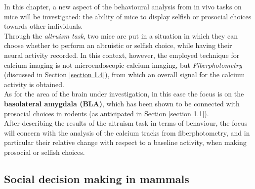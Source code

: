 \documentclass[12pt, a4paper]{article}
\begin{document}
In this chapter, a new aspect of the behavioural analysis from in vivo tasks on mice will be investigated: the ability of mice to display selfish or prosocial choices towards other individuals.\\
Through the \textit{altruism task}, two mice are put in a situation in which they can choose whether to perform an altruistic or selfish choice, while having their neural activity recorded. In this context, however, the employed technique for calcium imaging is not microendoscopic calcium imaging, but \textit{Fiberphotometry} (discussed in Section \ref{section 1.4}), from which an overall signal for the calcium activity is obtained.\\
As for the area of the brain under investigation, in this case the focus is on the \textbf{basolateral amygdala (BLA)}, which has been shown to be connected with prosocial choices in rodents (as anticipated in Section \ref{section 1.1}).\\
After describing the results of the altruism task in terms of behaviour, the focus will concern with the analysis of the calcium tracks from fiberphotometry, and in particular their relative change with respect to a baseline activity, when making prosocial or selfish choices.


\subsection{Social decision making in mammals}
\end{document}
